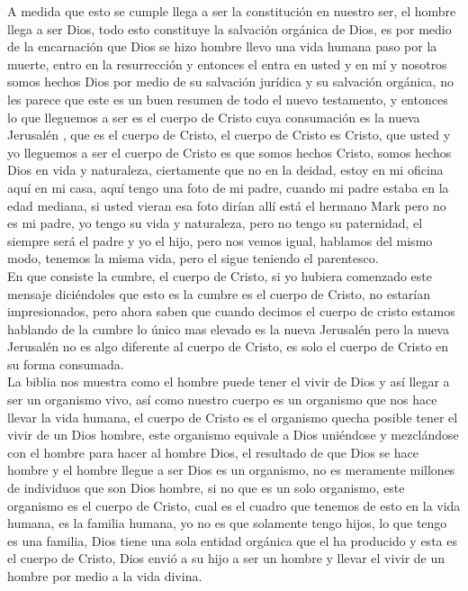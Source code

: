 \documentclass[12pt]{article}
\begin{document}
A medida que esto se cumple llega a ser la constitución en nuestro ser, el hombre llega a ser Dios, todo esto constituye la salvación orgánica de Dios, es por medio de la encarnación que Dios se hizo hombre llevo una vida humana paso por la muerte, entro en la resurrección y entonces el entra en usted y en mí y nosotros somos hechos Dios por medio de su salvación jurídica y su salvación orgánica, no les parece que este es un buen resumen de todo el nuevo testamento, y entonces lo que lleguemos a ser es el cuerpo de Cristo cuya consumación es la nueva Jerusalén , que es el cuerpo de Cristo, el cuerpo de Cristo es Cristo, que usted y yo lleguemos a ser el cuerpo de Cristo es que somos hechos Cristo, somos hechos Dios en vida y naturaleza, ciertamente que no en la deidad, estoy en mi oficina aquí en mi casa, aquí tengo una foto de mi padre, cuando mi padre estaba en la edad mediana, si usted  vieran esa foto dirían allí está el hermano Mark pero no es mi padre, yo tengo su vida y naturaleza, pero no tengo su paternidad, el siempre será el padre y yo el hijo, pero nos vemos igual, hablamos del mismo modo, tenemos la misma vida, pero el sigue teniendo el parentesco.\\

En que consiste la cumbre, el cuerpo de Cristo, si yo hubiera comenzado este mensaje diciéndoles que esto es la cumbre es el cuerpo de Cristo, no estarían impresionados, pero ahora saben que cuando decimos el cuerpo de cristo estamos hablando de la cumbre lo único mas elevado es la nueva Jerusalén pero la nueva Jerusalén no es algo diferente al cuerpo de Cristo, es solo el cuerpo de Cristo en su forma consumada. \\

La biblia nos muestra como el hombre puede tener el vivir de Dios y así llegar a ser un organismo vivo, así como nuestro cuerpo es un organismo que nos hace llevar la vida humana, el cuerpo de Cristo es el organismo quecha posible tener el vivir de un Dios hombre, este organismo equivale a Dios uniéndose y mezclándose con el hombre para hacer al hombre Dios, el resultado de que Dios se hace hombre y el hombre llegue a ser Dios es un organismo, no es meramente millones de individuos que son Dios hombre, si no que es un solo organismo, este organismo es el cuerpo de Cristo, cual es el cuadro que tenemos de esto en la vida humana, es la familia humana, yo no es que solamente tengo hijos, lo que tengo es una familia, Dios tiene una sola entidad orgánica que el ha producido y esta es el cuerpo de Cristo, Dios envió a su hijo a ser un hombre y llevar el vivir de un hombre por medio a la vida divina.\\
\end{document}
